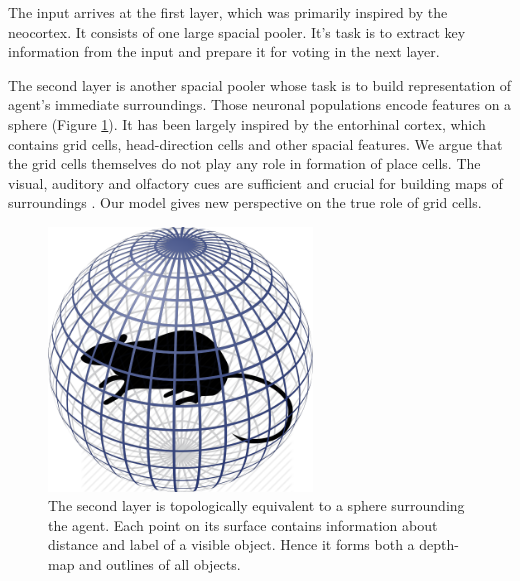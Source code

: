 \documentclass[12pt]{article}
\begin{document}
The input arrives at the first layer, which was primarily inspired by the neocortex. It consists of one large spacial pooler. It's task is to extract key information from the input and prepare it for voting in the next layer.

The second layer is another spacial pooler whose task is to build representation of agent's immediate surroundings.  Those neuronal populations encode features on a sphere (Figure \ref{fig:rodent_in_sphere}).  It has been largely inspired by the entorhinal cortex, which contains grid cells, head-direction cells and other spacial features. We argue that the grid cells\cite{Recurrent_grid,orientation_sensitive_cells,neural_basis_of_the_cognitive_map} themselves do not play any role in formation of place cells. The visual, auditory and olfactory cues are sufficient and crucial for building maps of surroundings \cite{boundary_vector_cells}. Our model gives new perspective on the true role of grid cells.


\begin{figure}[!h]
	\centering
	\includegraphics[width=7cm]{rodent_in_sphere}
	\caption{The second layer is topologically equivalent to a sphere surrounding the agent. Each point on its surface contains information about distance and label of a visible object. Hence it forms both a depth-map and outlines of all objects.}
	\label{fig:rodent_in_sphere}
\end{figure}
\end{document}
